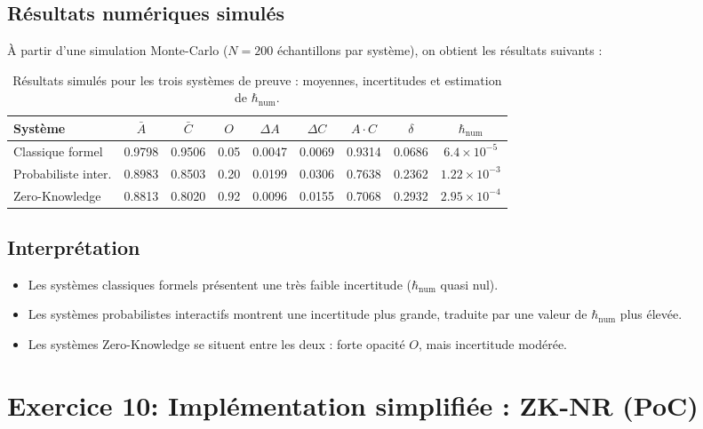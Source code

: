 \documentclass[12pt,a4paper]{report}
\begin{document}
\subsection*{Résultats numériques simulés}
À partir d'une simulation Monte-Carlo ($N=200$ échantillons par système), on obtient les résultats suivants :

\begin{table}[H]
	\centering
	\begin{tabular}{lcccccccc}
		\hline
		Système & $\bar A$ & $\bar C$ & $O$ & $\Delta A$ & $\Delta C$ & $A \cdot C$ & $\delta$ & $\hbar_{\text{num}}$ \\
		\hline
		Classique formel & 0.9798 & 0.9506 & 0.05 & 0.0047 & 0.0069 & 0.9314 & 0.0686 & $6.4 \times 10^{-5}$ \\
		Probabiliste inter. & 0.8983 & 0.8503 & 0.20 & 0.0199 & 0.0306 & 0.7638 & 0.2362 & $1.22 \times 10^{-3}$ \\
		Zero-Knowledge & 0.8813 & 0.8020 & 0.92 & 0.0096 & 0.0155 & 0.7068 & 0.2932 & $2.95 \times 10^{-4}$ \\
		\hline
	\end{tabular}
	\caption{Résultats simulés pour les trois systèmes de preuve : moyennes, incertitudes et estimation de $\hbar_{\text{num}}$.}
\end{table}

\subsection*{Interprétation}
\begin{itemize}
	\item Les systèmes classiques formels présentent une très faible incertitude ($\hbar_{\text{num}}$ quasi nul).
	\item Les systèmes probabilistes interactifs montrent une incertitude plus grande, traduite par une valeur de $\hbar_{\text{num}}$ plus élevée.
	\item Les systèmes Zero-Knowledge se situent entre les deux : forte opacité $O$, mais incertitude modérée.
\end{itemize}

\section*{ Exercice 10: Implémentation simplifiée : ZK-NR (PoC)}
\end{document}

